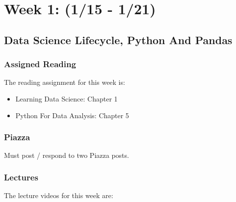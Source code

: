 \clearpage

\newcommand{\ChapTitle}{Week 1: (1/15 - 1/21)}
\newcommand{\SectionTitle}{Data Science Lifecycle, Python And Pandas}

\chapter{\ChapTitle}

\section{\SectionTitle}

\subsection{Assigned Reading}

The reading assignment for this week is:

\begin{itemize}
    \item Learning Data Science: Chapter 1
    \item Python For Data Analysis: Chapter 5
\end{itemize}

\subsection{Piazza}

Must post / respond to two Piazza posts. 

\subsection{Lectures}

The lecture videos for this week are:

